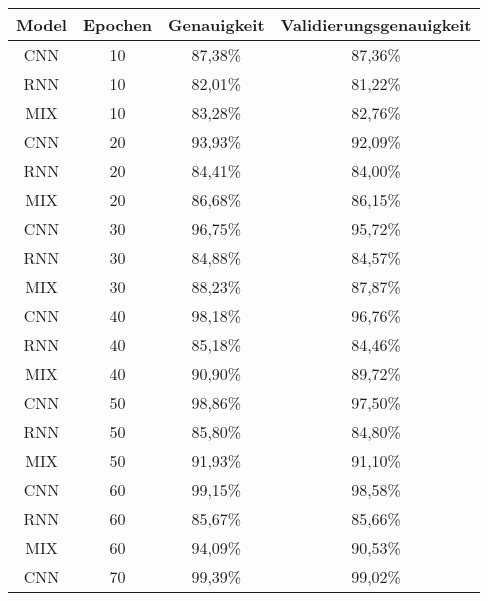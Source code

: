         \begin{table}[H]
            \centering
            \begin{tabular}{|c|c|c|c|}
                \hline
                Model & Epochen & Genauigkeit & Validierungsgenauigkeit \\
                \hline
                CNN & 10 &  87,38\% & 87,36\%  \\ 
                \hline
                RNN & 10 &  82,01\% & 81,22\%  \\ 
                \hline
                MIX & 10 &  83,28\% & 82,76\% \\ 
                \hline
                \hline
                CNN & 20 &  93,93\% & 92,09\%  \\ 
                \hline
                RNN & 20 &  84,41\% & 84,00\% \\ 
                \hline
                MIX & 20 &  86,68\% & 86,15\%  \\ 
                \hline
                \hline
                CNN & 30 &  96,75\% & 95,72\%  \\ 
                \hline
                RNN & 30 &  84,88\% & 84,57\%  \\ 
                \hline
                MIX & 30 &  88,23\% & 87,87\%  \\ 
                \hline
                \hline
                CNN & 40 &  98,18\% & 96,76\% \\ 
                \hline
                RNN & 40 &  85,18\% & 84,46\%  \\ 
                \hline
                MIX & 40 &  90,90\% & 89,72\%  \\ 
                \hline
                \hline
                CNN & 50 &  98,86\% & 97,50\%  \\ 
                \hline
                RNN & 50 &  85,80\% & 84,80\%  \\ 
                \hline
                MIX & 50 &  91,93\% & 91,10\%  \\ 
                \hline
                \hline
                CNN & 60 &  99,15\% & 98,58\%  \\ 
                \hline
                RNN & 60 &  85,67\% & 85,66\%  \\ 
                \hline
                MIX & 60 &  94,09\% & 90,53\%  \\ 
                \hline
                \hline
                CNN & 70 &  99,39\% & 99,02\%  \\ 

\end{tabular}
\end{table}
